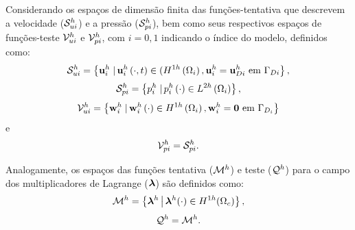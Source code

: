 Considerando os espaços de dimensão finita das funções-tentativa que descrevem a velocidade ($\mathcal{S}_{ui}^h$) e a pressão ($\mathcal{S}_{pi}^h$), bem como seus respectivos espaços de funções-teste $\mathcal{V}_{ui}^h$ e $\mathcal{V}_{pi}^h$, com $i = 0,1$ indicando o índice do modelo, definidos como:
\begin{align}
	\mathcal{S}_{ui}^h = \left\{\mathbf{u}_{i}^{h} \left . \right| \mathbf{u}_{i}^{h} \left(\cdot,t\right) \in (H^{1h}\left(\Omega_i\right), \mathbf{u}_{i}^{h} = \mathbf{u}_{Di}^{h} \textrm { em}  \ \Gamma_{Di} \right\},
\end{align}
\begin{align}
	\mathcal{S}_{pi}^h = \left\{p_{i}^{h} \left . \right| p_{i}^{h} \left(\cdot\right) \in L^{2h}\left(\Omega_i\right) \right\},
\end{align}
\begin{align}
	\mathcal{V}_{ui}^h = \left\{\mathbf{w}_{i}^{h} \left . \right| \mathbf{w}_{i}^{h} \left(\cdot\right) \in H^{1h}\left(\Omega_i\right), \mathbf{w}_{i}^{h} = \mathbf{0}  \textrm { em} \ \Gamma_{D_i} \right\}
\end{align}
\noindent e
\begin{align}
	\mathcal{V}_{pi}^h = \mathcal{S}_{pi}^h.
\end{align}

Analogamente, os espaços das funções tentativa ($\mathcal{M}^h$) e teste ($\mathcal{Q}^h$) para o campo dos multiplicadores de Lagrange ($\boldsymbol{\lambda}$) são definidos como:
\begin{align}
	\mathcal{M}^h = \left\{ \boldsymbol{\lambda}^{h} \,\middle|\, \boldsymbol{\lambda}^{h}(\cdot) \in H^{1h}(\Omega_c) \right\},
\end{align}
\begin{align}
	\mathcal{Q}^h = \mathcal{M}^h.
\end{align}

